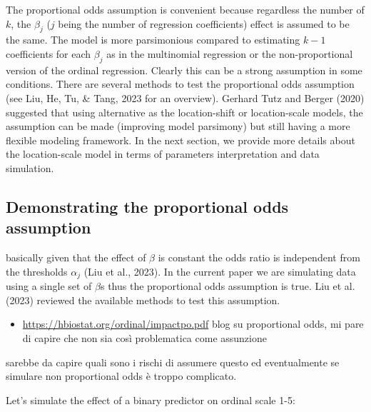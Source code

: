 \documentclass[
  man,floatsintext]{apa6}
\providecommand{\tightlist}{%
  \setlength{\itemsep}{0pt}\setlength{\parskip}{0pt}}
\begin{document}
\normalsize

The proportional odds assumption is convenient because regardless the number of \(k\), the \(\beta_j\) (\(j\) being the number of regression coefficients) effect is assumed to be the same. The model is more parsimonious compared to estimating \(k - 1\) coefficients for each \(\beta_j\) as in the multinomial regression or the non-proportional version of the ordinal regression. Clearly this can be a strong assumption in some conditions. There are several methods to test the proportional odds assumption (see Liu, He, Tu, \& Tang, 2023 for an overview). Gerhard Tutz and Berger (2020) suggested that using alternative as the location-shift or location-scale models, the assumption can be made (improving model parsimony) but still having a more flexible modeling framework. In the next section, we provide more details about the location-scale model in terms of parameters interpretation and data simulation.

\subsection{Demonstrating the proportional odds assumption}\label{demonstrating-the-proportional-odds-assumption}

basically given that the effect of \(\beta\) is constant the odds ratio is independent from the thresholds \(\alpha_j\) (Liu et al., 2023). In the current paper we are simulating data using a single set of \(\beta\)s thus the proportional odds assumption is true. Liu et al. (2023) reviewed the available methods to test this assumption.

\begin{itemize}
\tightlist
\item
  \url{https://hbiostat.org/ordinal/impactpo.pdf} blog su proportional odds, mi pare di capire che non sia così problematica come assunzione
\end{itemize}

sarebbe da capire quali sono i rischi di assumere questo ed eventualmente se simulare non proportional odds è troppo complicato.

Let's simulate the effect of a binary predictor on ordinal scale 1-5:

\scriptsize
\end{document}
